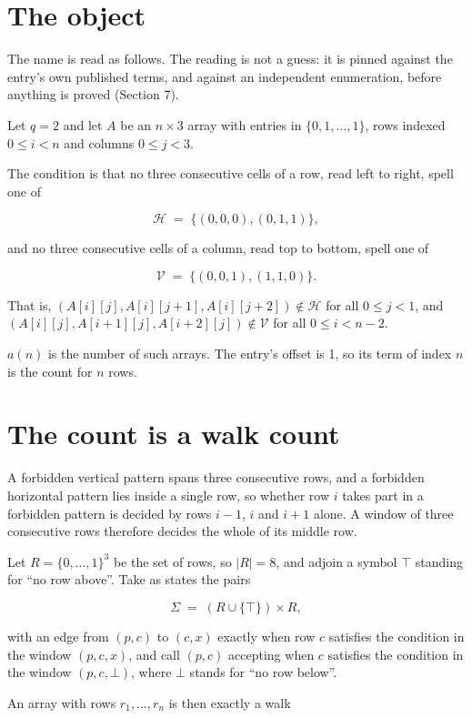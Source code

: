 \documentclass[11pt]{article}
\theoremstyle{definition}
\begin{document}
\section{The object}

The name is read as follows. The reading is not a guess: it is pinned against the entry's own published terms, and against an independent enumeration, before anything is proved (Section 7).

Let $q = 2$ and let $A$ be an $n \times 3$ array with entries in $\{0,1,\dots,1\}$, rows indexed $0 \le i < n$ and columns $0 \le j < 3$.

The condition is that no three consecutive cells of a row, read left to right, spell one of

\[\mathcal{H} \;=\; \{(0,0,0), (0,1,1)\},\]

and no three consecutive cells of a column, read top to bottom, spell one of

\[\mathcal{V} \;=\; \{(0,0,1), (1,1,0)\}.\]

That is, $(A[i][j],A[i][j{+}1],A[i][j{+}2]) \notin \mathcal{H}$ for all $0 \le j < 1$, and $(A[i][j],A[i{+}1][j],A[i{+}2][j]) \notin \mathcal{V}$ for all $0 \le i < n-2$.

$a(n)$ is the number of such arrays. The entry's offset is 1, so its term of index $n$ is the count for $n$ rows.

\section{The count is a walk count}

A forbidden vertical pattern spans three consecutive rows, and a forbidden horizontal pattern lies inside a single row, so whether row $i$ takes part in a forbidden pattern is decided by rows $i-1$, $i$ and $i+1$ alone. A window of three consecutive rows therefore decides the whole of its middle row.

Let $R = \{0,\dots,1\}^{3}$ be the set of rows, so $|R| = 8$, and adjoin a symbol $\top$ standing for ``no row above''. Take as states the pairs

\[\Sigma \;=\; (R \cup \{\top\}) \times R,\]

with an edge from $(p,c)$ to $(c,x)$ exactly when row $c$ satisfies the condition in the window $(p,c,x)$, and call $(p,c)$ accepting when $c$ satisfies the condition in the window $(p,c,\bot)$, where $\bot$ stands for ``no row below''.

An array with rows $r_1,\dots,r_n$ is then exactly a walk
\end{document}
